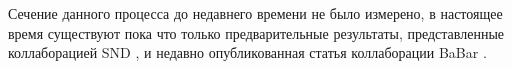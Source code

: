 Сечение данного процесса до недавнего времени не было измерено, в настоящее время существуют пока что только предварительные результаты, представленные коллаборацией SND \cite{korneev}, и недавно опубликованная статья коллаборации BaBar \cite{BaBar}. %

